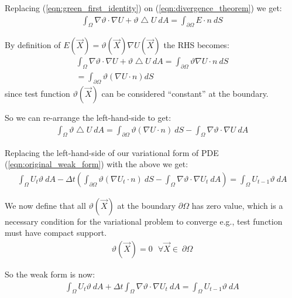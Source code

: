 \documentclass{birkjour}
\numberwithin{equation}{section}
\begin{document}
Replacing (\ref{eqn:green_first_identity}) on (\ref{eqn:divergence_theorem}) we get:
\begin{eqnarray}
	\int_{\Omega}{ \nabla \vartheta \cdot \nabla U + \vartheta \bigtriangleup U  \ dA} = \int_{\partial \Omega} {  E \cdot n  \ dS } \nonumber
\end{eqnarray}

By definition of $E(\vec X) = \vartheta(\vec X) \nabla U(\vec X)$ the RHS becomes:
\begin{eqnarray}
	\int_{\Omega}{ \nabla \vartheta \cdot \nabla U + \vartheta \bigtriangleup U  \ dA} = \int_{\partial \Omega} { \vartheta \nabla U \cdot n  \ dS } \nonumber \\
	= \int_{\partial \Omega} { \vartheta \left( \nabla U \cdot n\right) dS }
\end{eqnarray}
since test function $\vartheta(\vec X)$ can be considered ``constant'' at the boundary.

So we can re-arrange the left-hand-side to get:
\begin{eqnarray}
	\int_{\Omega}{\vartheta \bigtriangleup U  \ dA} = \int_{\partial \Omega} { \vartheta \left( \nabla U \cdot n\right)  \ dS } - \int_{\Omega}{ \nabla \vartheta \cdot \nabla U  \ dA}
\end{eqnarray}

Replacing the left-hand-side of our variational form of PDE (\ref{eqn:original_weak_form}) with the above we get:
 \begin{eqnarray}
	\label{eqn:standard_weak_form}
	\int_{\Omega}{ U_t \vartheta \ dA } - \Delta t \left(\int_{\partial \Omega} { \vartheta \left( \nabla U_t \cdot n\right)  \ dS } - \int_{\Omega}{ \nabla \vartheta \cdot \nabla U_t \ dA}\right) = \int_{\Omega} { U_{t-1} \vartheta \ dA }
\end{eqnarray}

We now define that all $\vartheta(\vec X)$ at the boundary $\partial \Omega$ has zero value, 
which is a necessary condition for the variational problem to converge e.g., test function must have compact support.
\begin{eqnarray}
	\vartheta(\vec X) = 0  \ \ \  \forall \vec X \in \ \partial \Omega
\end{eqnarray}

So the weak form is now:
\begin{eqnarray}
	\label{eqn:weak_form}
	\int_{\Omega}{ U_t \vartheta \ dA } + \Delta t \int_{\Omega}{ \nabla \vartheta \cdot \nabla U_t \ dA} = \int_{\Omega} { U_{t-1} \vartheta \ dA }
\end{eqnarray}
\end{document}

